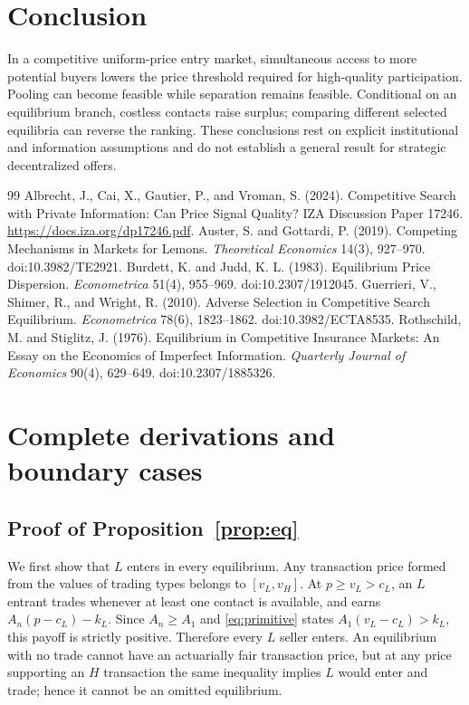 \documentclass[11pt]{article}
\begin{document}
\section{Conclusion}

In a competitive uniform-price entry market, simultaneous access to more potential buyers lowers the price threshold required for high-quality participation. Pooling can become feasible while separation remains feasible. Conditional on an equilibrium branch, costless contacts raise surplus; comparing different selected equilibria can reverse the ranking. These conclusions rest on explicit institutional and information assumptions and do not establish a general result for strategic decentralized offers.

\begin{thebibliography}{99}
 Albrecht, J., Cai, X., Gautier, P., and Vroman, S. (2024). Competitive Search with Private Information: Can Price Signal Quality? IZA Discussion Paper 17246. \url{https://docs.iza.org/dp17246.pdf}.
 Auster, S. and Gottardi, P. (2019). Competing Mechanisms in Markets for Lemons. \emph{Theoretical Economics} 14(3), 927--970. doi:10.3982/TE2921.
 Burdett, K. and Judd, K. L. (1983). Equilibrium Price Dispersion. \emph{Econometrica} 51(4), 955--969. doi:10.2307/1912045.
 Guerrieri, V., Shimer, R., and Wright, R. (2010). Adverse Selection in Competitive Search Equilibrium. \emph{Econometrica} 78(6), 1823--1862. doi:10.3982/ECTA8535.
 Rothschild, M. and Stiglitz, J. (1976). Equilibrium in Competitive Insurance Markets: An Essay on the Economics of Imperfect Information. \emph{Quarterly Journal of Economics} 90(4), 629--649. doi:10.2307/1885326.
\end{thebibliography}

\appendix
\section{Complete derivations and boundary cases}\label{app:proofs}

\subsection{Proof of Proposition~\ref{prop:eq}}\label{proof:eq}
We first show that $L$ enters in every equilibrium. Any transaction price formed from the values of trading types belongs to $[v_L,v_H]$. At $p\geq v_L>c_L$, an $L$ entrant trades whenever at least one contact is available, and earns $A_n(p-c_L)-k_L$. Since $A_n\geq A_1$ and \eqref{eq:primitive} states $A_1(v_L-c_L)>k_L$, this payoff is strictly positive. Therefore every $L$ seller enters. An equilibrium with no trade cannot have an actuarially fair transaction price, but at any price supporting an $H$ transaction the same inequality implies $L$ would enter and trade; hence it cannot be an omitted equilibrium.
\end{document}
